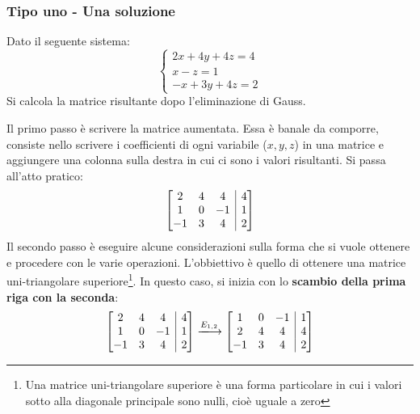 \documentclass[a4paper]{article}
\makeatletter
\newenvironment{rowequmatbra}[1]{\left[\array{@{}#1@{}}}{\endarray\right]}
\makeatother
\begin{document}
	\subsubsection{Tipo uno - Una soluzione}
	
	Dato il seguente sistema:
	\begin{equation*}
		\begin{cases}
			2x + 4y + 4z = 4 \\
			x - z = 1 \\
			-x + 3y + 4z = 2
		\end{cases}
	\end{equation*}
	Si calcola la matrice risultante dopo l'eliminazione di Gauss.\newline
	
	\noindent
	Il \textcolor{Red3}{primo passo} è scrivere la matrice aumentata. Essa è banale da comporre, consiste nello scrivere i coefficienti di ogni variabile ($x,y,z$) in una matrice e aggiungere una colonna sulla destra in cui ci sono i valori risultanti. Si passa all'atto pratico:
	\begin{equation*}
		\begin{rowequmatbra}{ccc|c}
			2  & 4 &  4 & 4 \\
			1  & 0 & -1 & 1 \\
			-1 & 3 &  4 & 2
		\end{rowequmatbra}
	\end{equation*}
	Il \textcolor{Red3}{secondo passo} è eseguire alcune considerazioni sulla forma che si vuole ottenere e procedere con le varie operazioni. L'obbiettivo è quello di ottenere una matrice uni-triangolare superiore\footnote{Una matrice uni-triangolare superiore è una forma particolare in cui i valori sotto alla diagonale principale sono nulli, cioè uguale a zero}. In questo caso, si inizia con lo \textbf{scambio della prima riga con la seconda}:
	\begin{equation*}
		\begin{rowequmatbra}{ccc|c}
			2  & 4 &  4 & 4 \\
			1  & 0 & -1 & 1 \\
			-1 & 3 &  4 & 2
		\end{rowequmatbra} \xlongrightarrow{E_{1,2}}
		\begin{rowequmatbra}{ccc|c}
			1  & 0 & -1 & 1 \\
			2  & 4 &  4 & 4 \\
			-1 & 3 &  4 & 2
		\end{rowequmatbra}
	\end{equation*}
\end{document}
